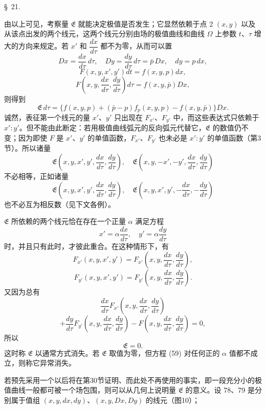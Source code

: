 \documentclass[11pt,a4paper,leqno]{article}
\begin{document}
\begin{center}{\large \S~21.}\end{center}

由以上可见，考察量 $\mathfrak{E}$ 就能决定极值是否发生；它显然依赖于点 2 $(x,y)$ 以及从该点出发的两个线元，这两个线元分别由场的极值曲线和曲线 $\Omega$ 上参数 $t$、$\tau$ 增大的方向来规定。若 $x'$ 和 $\dfrac{dx}{d\tau}$ 都不为零，从而可以置
\[
D x=\frac{dx}{d\tau}\,d\tau,\quad
D y=\frac{dy}{d\tau}\,d\tau=\bar{p}\,D x,\quad
dy=p\,dx,
\]
\[
F(x,y,x',y')dt=f(x,y,p)dx,
\]
\[
F\left(x,y,\frac{dx}{d\tau},\frac{dy}{d\tau}\right)d\tau
=
f(x,y,\bar{p})D x,
\]
则得到
\begin{equation}\tag{58}
\mathfrak{E}\,d\tau
=
\{f(x,y,p)+(\bar{p}-p)f_p(x,y,p)-f(x,y,\bar{p})\}D x.
\end{equation}
诚然，表征第一个线元的量 $x'$、$y'$ 只出现在 $F_{x'}$、$F_{y'}$ 中，而这些表达式只依赖于 $x':y'$。但不能由此断定：若用极值曲线弧元的反向弧元代替它，$\mathfrak{E}$ 的数值仍不变；因为即使 $F$ 是 $x'$、$y'$ 的单值函数，$F_{x'}$、$F_{y'}$ 也未必是 $x':y'$ 的单值函数（第3节）。所以诸量
\[
\mathfrak{E}\left(x,y,x',y',\frac{dx}{d\tau},\frac{dy}{d\tau}\right),\quad
\mathfrak{E}\left(x,y,-x',-y',\frac{dx}{d\tau},\frac{dy}{d\tau}\right)
\]
不必相等，正如诸量
\[
\mathfrak{E}\left(x,y,x',y',\frac{dx}{d\tau},\frac{dy}{d\tau}\right),\quad
\mathfrak{E}\left(x,y,x',y',-\frac{dx}{d\tau},-\frac{dy}{d\tau}\right)
\]
也不必互为相反数（见下文各例）。

$\mathfrak{E}$ 所依赖的两个线元恰在存在一个正量 $\alpha$ 满足方程
\begin{equation}\tag{59}
x'=\alpha\frac{dx}{d\tau},\quad
y'=\alpha\frac{dy}{d\tau}
\end{equation}
时，并且只有此时，才彼此重合。在这种情形下，有
\[
F_{x'}(x,y,x',y')
=
F_{x'}\left(x,y,\frac{dx}{d\tau},\frac{dy}{d\tau}\right),
\]
\[
F_{y'}(x,y,x',y')
=
F_{y'}\left(x,y,\frac{dx}{d\tau},\frac{dy}{d\tau}\right).
\]
又因为总有
\[
\frac{dx}{d\tau}F_{x'}\left(x,y,\frac{dx}{d\tau},\frac{dy}{d\tau}\right)
\]
\[
+
\frac{dy}{d\tau}F_{y'}\left(x,y,\frac{dx}{d\tau},\frac{dy}{d\tau}\right)
-
F\left(x,y,\frac{dx}{d\tau},\frac{dy}{d\tau}\right)=0,
\]
所以
\[
\mathfrak{E}=0.
\]
这时称 $\mathfrak{E}$ 以通常方式消失。若 $\mathfrak{E}$ 取值为零，但方程 (59) 对任何正的 $\alpha$ 值都不成立，则称它异常消失。

若预先采用一个以后将在第30节证明、而此处不再使用的事实，即一段充分小的极值曲线一般都可被一个场包围，则可以从几何上说明量 $\mathfrak{E}$ 的意义。设 78、79 是分别属于值组 $(x,y,dx,dy)$、$(x,y,Dx,Dy)$ 的线元（图10）；
\end{document}
